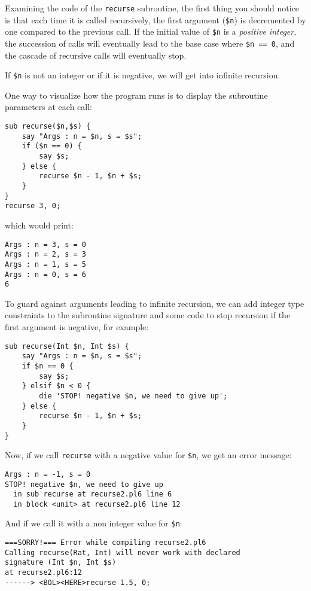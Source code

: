 Examining the code of the {\tt recurse} subroutine, the 
first thing you should notice is that each time it 
is called recursively, the first argument (\verb'$n') is 
decremented by one compared to the previous call. If the 
initial value of \verb'$n' is a \emph{positive integer}, the 
succession of calls will eventually lead to the base case 
where \verb'$n == 0', and the cascade of recursive calls 
will eventually stop. 

If \verb'$n' is not an integer or if it is negative, we will get 
into infinite recursion.

One way to visualize how the program runs is to display 
the subroutine parameters at each call:

\begin{verbatim}
sub recurse($n,$s) {
    say "Args : n = $n, s = $s";
    if ($n == 0) {
        say $s;
    } else {
        recurse $n - 1, $n + $s;
    }
}
recurse 3, 0;
\end{verbatim}
which would print:
\begin{verbatim}
Args : n = 3, s = 0
Args : n = 2, s = 3
Args : n = 1, s = 5
Args : n = 0, s = 6
6
\end{verbatim}

To guard against arguments leading to infinite recursion, 
we can add integer type constraints to the subroutine 
signature and some code to stop recursion if the first 
argument is negative, for example:

\begin{verbatim}
sub recurse(Int $n, Int $s) {
    say "Args : n = $n, s = $s";
    if $n == 0 {
        say $s;
    } elsif $n < 0 {
        die 'STOP! negative $n, we need to give up';
    } else {
        recurse $n - 1, $n + $s;
    }
}
\end{verbatim}
%

Now, if we call {\tt recurse} with a negative value for 
\verb'$n', we get an error message:

\begin{verbatim}
Args : n = -1, s = 0
STOP! negative $n, we need to give up
  in sub recurse at recurse2.pl6 line 6
  in block <unit> at recurse2.pl6 line 12
\end{verbatim}
%

And if we call it with a non integer value for \verb'$n':

\begin{verbatim}
===SORRY!=== Error while compiling recurse2.pl6
Calling recurse(Rat, Int) will never work with declared
signature (Int $n, Int $s)
at recurse2.pl6:12
------> <BOL><HERE>recurse 1.5, 0;
\end{verbatim}
%

